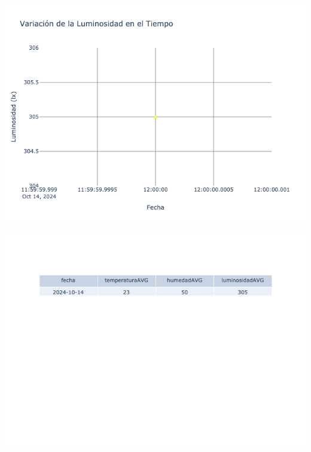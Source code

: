 \documentclass{article}
\begin{document}
    \noindent
    \begin{minipage}{0.48\textwidth}
        \centering
        \includegraphics[width=\textwidth]{../img/poli/LS503-90Dias-03-12-2024.png}
    \end{minipage}
    \hfill
    \begin{minipage}{0.48\textwidth}
        \centering
        \includegraphics[width=\textwidth]{../img/tables/CAVG503-90Dias-03-12-2024.png}
    \end{minipage}
    
\end{document}
